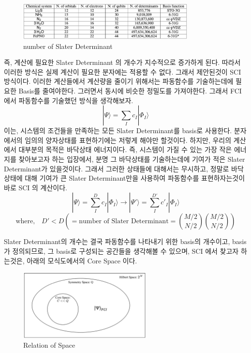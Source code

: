 \documentclass[11pt]{article}
\begin{document}
\begin{figure}[htbp]
  \centering
  \includegraphics[width=0.8\textwidth]{fig/numofdet.png}
  \caption{number of Slater Determinant}
  \label{fig:example2}
\end{figure}
즉, 계산에 필요한 Slater Determinant 의 개수가 지수적으로 증가하게 된다. 따라서 이러한 방식은 실제 계산이 필요한 분자에는 적용할 수 없다. 그래서 제안된것이 SCI 방식이다.
이러한 계산들에서 계산량을 줄이기 위해서는 파동함수를 기술하는데에 필요한 Basis를 줄여야한다. 그러면서 동시에 비슷한 정밀도를 가져야한다. 
그래서 FCI 에서 파동함수를 기술했던 방식을 생각해보자. 
\[
|\Psi\rangle = \sum_I c_I |\Phi_I\rangle
\]
이는, 시스템의 조건들을 만족하는 모든 Slater Determinant를 basis로 사용한다. 분자에서의 임의의 양자상태를 표현하기에는 저렇게 해야만 할것이다. 
하지만, 우리의 계산에서 대부분의 목적은 바닥상태 에너지이다. 즉, 시스템이 가질 수 있는 가장 작은 에너지를 찾아보고자 하는 입장에서, 분명 그 바닥상태를 기술하는데에 기여가 적은 Slater Determinant가 있을것이다. 
그래서 그러한 상태들에 대해서는 무시하고, 정말로 바닥상태에 대해 기여가 큰 Slater Determinant만을 사용하여 파동함수를 표현하자는것이 바로 SCI 의 계산이다. 
\[
|\Psi\rangle = \sum_{I}^{D} c_I |\Phi_I\rangle \longrightarrow  |\Psi'\rangle = \sum_{I}^{D'} c'_I |\Phi_I\rangle 
\]
\[
\text{where,} \quad D' < D \left(= \text{number of Slater Determinant} = \binom{M/2}{N/2}\binom{M/2}{N/2}\right)
\]

Slater Determinant의 개수는 결국 파동함수를 나타내기 위한 basis의 개수이고, basis가 정의되므로, 그 basis로 구성되는 공간들을 생각해볼 수 있으며, SCI 에서 찾고자 하는것은, 아래의 모식도에서의 Core Space 이다. 

\begin{figure}[htbp]
  \centering
  \includegraphics[width=0.6\textwidth]{fig/space.png}
  \caption{Relation of Space}
  \label{fig:example2}
\end{figure}
\end{document}
